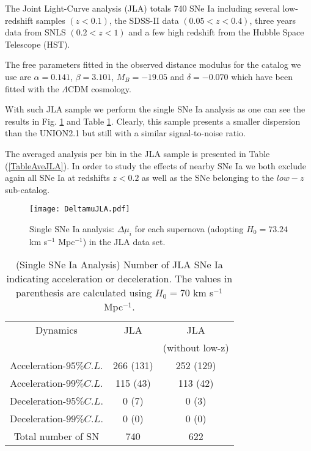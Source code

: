 \documentclass[nofootinbib,twocolumn]{revtex4}
\begin{document}
The Joint Light-Curve analysis (JLA) \cite{Betoule:2014frx} totals 740 SNe Ia including several low-redshift samples $(z<0.1)$, the SDSS-II data $(0.05<z<0.4)$, three years data from SNLS $(0.2<z<1)$ and a few high redshift from the Hubble Space Telescope (HST).

The free parameters fitted in the observed distance modulus for the catalog we use are $\alpha=0.141$, $\beta=3.101$, $M_{B}=-19.05$ and $\delta=-0.070$ which have been fitted with the $\Lambda$CDM cosmology.
 
With such JLA sample we perform the single SNe Ia analysis as one can see the results in Fig. \ref{FigSingleJLA} and Table \ref{TableSingleJLA}. Clearly, this sample presents a smaller dispersion than the UNION2.1 but still with a similar signal-to-noise ratio. 

The averaged analysis per bin in the JLA sample is presented in Table (\ref{TableAveJLA}). In order to study the effects of nearby SNe Ia we both exclude again all SNe Ia at redshifts $z<0.2$ as well as the SNe belonging to the $low-z$ sub-catalog. 

\begin{figure}
\centering
\texttt{[image: DeltamuJLA.pdf]}
\caption{Single SNe Ia analysis: $\Delta \mu_i$ for each supernova (adopting $H_0=73.24$ km s$^{-1}$ Mpc$^{-1}$) in the JLA data set.}
\label{FigSingleJLA}
\end{figure}


\begin{table}
\centering\caption{(Single SNe Ia Analysis) Number of JLA SNe Ia indicating acceleration or deceleration. The values in parenthesis are calculated using $H_0=70$ km s$^{-1}$ Mpc$^{-1}$.}
{\begin{tabular} {c||c||c}
Dynamics & JLA & JLA  \\
 &  & (without low-z) \\
\hline \hline 
Acceleration-$95 \% C.L.$ & 266 (131) & 252 (129) \\
Acceleration-$99 \% C.L.$ & 115 (43) & 113 (42) \\
Deceleration-$95 \% C.L.$ & 0 (7) & 0 (3)  \\
Deceleration-$99 \% C.L.$ & 0 (0) & 0 (0)  \\
Total number of SN & 740 & 622  \\
\hline
\end{tabular}} 
\label{TableSingleJLA}
\end{table}
\end{document}
